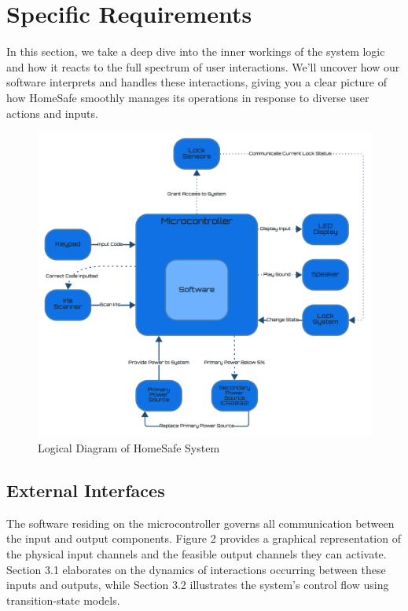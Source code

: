 \documentclass{article}
\begin{document}
\section{Specific Requirements}
In this section, we take a deep dive into the inner workings of the system logic and how it reacts to the full spectrum of user interactions. We'll uncover how our software interprets and handles these interactions, giving you a clear picture of how HomeSafe smoothly manages its operations in response to diverse user actions and inputs.

\begin{figure}[!h]
    \centering
    \includegraphics[scale=0.3]{docs/figs/logical_diagram.png}
    \caption{Logical Diagram of HomeSafe System \cite{lucidLucidVisual}}
    \label{fig:diagram2}
\end{figure}

\subsection{External Interfaces}
The software residing on the microcontroller governs all communication between the input and output components. Figure 2 provides a graphical representation of the physical input channels and the feasible output channels they can activate. Section 3.1 elaborates on the dynamics of interactions occurring between these inputs and outputs, while Section 3.2 illustrates the system's control flow using transition-state models.
\end{document}

